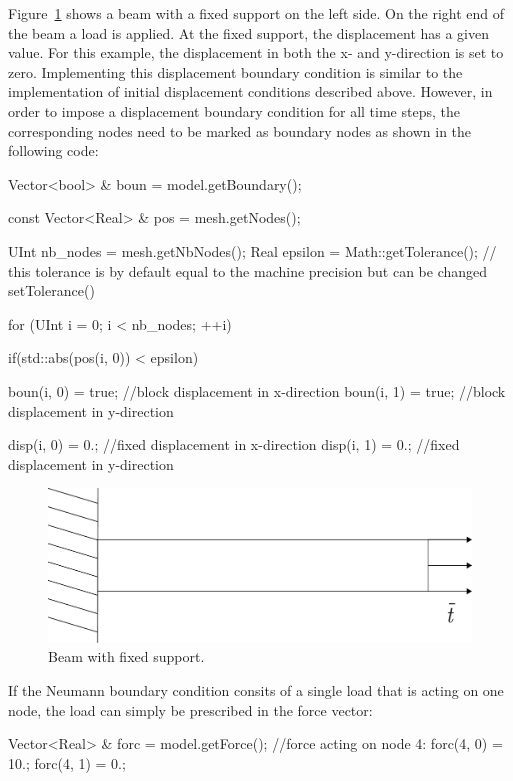\documentclass[a4paper,11pt]{book}
\begin{document}
Figure~\ref{fig:smm:dirichlet_bc} shows a beam with a fixed support on the left side. On the right end of the beam a load is applied. At the fixed support, the displacement has a given value. For this example, the displacement in both the x- and y-direction is set to zero. Implementing this displacement boundary condition is similar to the implementation of initial displacement conditions described above. However, in order to impose a displacement boundary condition for all time steps, the corresponding nodes need to be marked as boundary nodes as shown in the following code:
\begin{cpp}
  Vector<bool> & boun = model.getBoundary(); 

  const Vector<Real> & pos = mesh.getNodes();

  UInt nb_nodes = mesh.getNbNodes();
  Real epsilon = Math::getTolerance(); // this tolerance is by default equal to the machine precision but can be changed setTolerance()

  for (UInt i = 0; i < nb_nodes; ++i) {
    if(std::abs(pos(i, 0)) < epsilon) {
      boun(i, 0) = true;  //block displacement in x-direction
      boun(i, 1) = true;  //block displacement in y-direction

      disp(i, 0) = 0.;   //fixed displacement in x-direction
      disp(i, 1) = 0.;   //fixed displacement in y-direction
    }
  }
\end{cpp}
\begin{figure}[!htb]
  \centering
  \includegraphics[scale=0.4]{figures/dirichlet}
  \caption{Beam with fixed support.\label{fig:smm:dirichlet_bc}}
\end{figure}

If the Neumann boundary condition consits of a single load that is acting on one node, the load can simply be prescribed in the force vector:
\begin{cpp}
  Vector<Real> & forc = model.getForce();
  //force acting on node 4:
  forc(4, 0) = 10.;
  forc(4, 1) = 0.;  
\end{cpp}
\end{document}
